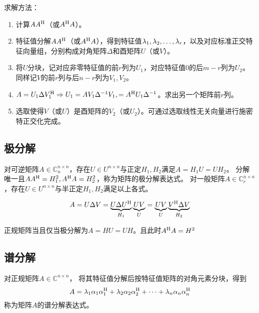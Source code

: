 求解方法：
\begin{enumerate}
    \item 计算$AA^\mathrm{H}$（或$A^\mathrm{H} A$）。
    \item 特征值分解$AA^\mathrm{H}$（或$A^\mathrm{H} A$），得到特征值$\VectorComma{\lambda}{r}$，以及对应标准正交特征向量组，分别构成对角矩阵$\Delta$和酉矩阵$U$（或$V$）。
    \item 将$U$分块，记对应非零特征值的前$r$列为$U_1$，对应特征值$0$的后$m-r$列为$U_2$。同样记$V$的前$r$列与后$n-r$列为$V_1,V_2$。
    \item $A=U_1\Delta V_1^\mathrm{H}\Rightarrow U_1=A V_1\Delta^{-1} V_1, = A^\mathrm{H} U_1\Delta^{-1}$。求出另一个矩阵前$r$列。
    \item 选取使得$V$（或$U$）是酉矩阵的$V_2$（或$U_2$）。可通过选取线性无关向量进行施密特正交化完成。
\end{enumerate}

\subsection{极分解}

\begin{definition}[极分解]
    对可逆矩阵$A\in \mathbb{C}^{n\times n}_n$，存在$U\in U^{n\times n}$与正定$H_1,H_2$满足$A=H_1 U=U H_2$。
    分解唯一且$AA^\mathrm{H} = H_1^2, A^\mathrm{H} A = H_2^2$，称为矩阵的极分解表达式。
    对一般矩阵$A\in\mathbb{C}^{n\times n}_r$，存在$U\in U^{n\times n}$与半正定$H_1,H_2$满足以上各式。
\end{definition}

\begin{theorem}[使用奇异值分解表达极分解]
    \[
        A=U\Delta V=
        \underbrace{U\Delta U^\mathrm{H}}_{H_1} \underbrace{UV}_{U}=
        \underbrace{UV}_{U} \underbrace{V^\mathrm{H} \Delta V}_{H_2}
    \]
\end{theorem}

\begin{theorem}
    正规矩阵当且仅当极分解为$A=HU=UH$。且此时$A^\mathrm{H} A=H^2$
\end{theorem}

\subsection{谱分解}

\begin{definition}[谱分解]
    对正规矩阵$A\in \mathbb{C}^{n\times n}$，
    将其特征值分解后按特征值矩阵的对角元素分块，得到
    \[
        A = \lambda_1 \alpha_1 \alpha_1^\mathrm{H}
        + \lambda_2 \alpha_2\alpha_2^\mathrm{H}+\dots
        +\lambda_n \alpha_n\alpha_n^\mathrm{H}
    \]
    称为矩阵$A$的谱分解表达式。
\end{definition}

